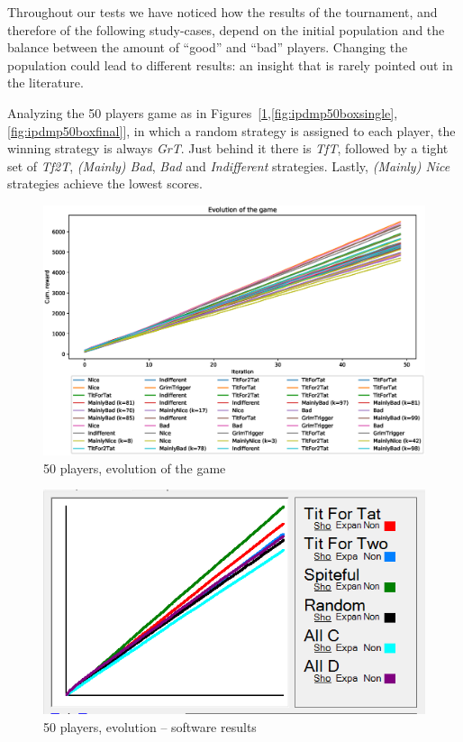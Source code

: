 \documentclass[journal,10pt,twoside]{IEEEtran}
\begin{document}
Throughout our tests we have noticed how the results of the tournament, and therefore of the following study-cases, depend on the initial population and the balance between the amount of ``good'' and ``bad'' players. Changing the population could lead to different results: an insight that is rarely pointed out in the literature.

Analyzing the 50 players game as in Figures~[\ref{fig:ipdmp50evo},\ref{fig:ipdmp50boxsingle},\ref{fig:ipdmp50boxfinal}], in which a random strategy is assigned to each player, the winning strategy is always \textit{GrT}. Just behind it there is \textit{TfT}, followed by a tight set of \textit{Tf2T}, \textit{(Mainly) Bad}, \textit{Bad} and \textit{Indifferent} strategies. Lastly, \textit{(Mainly) Nice} strategies achieve the lowest scores.

\begin{figure}[!ht]
    \centering
    \includegraphics[width=1\columnwidth]{../img/ipdmp/ipdmp-evolution-of-game-50}
    \caption{50 players, evolution of the game}
    \label{fig:ipdmp50evo}
\end{figure}

\begin{figure}[!ht]
    \centering
	\includegraphics[width=.8\columnwidth]{../img/ipdmp/ipdmp50-plot-det}
	\caption{50 players, evolution -- software results \cite{demosw}}
	\label{fig:ipdmp50evosw}
\end{figure}
\end{document}
